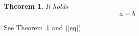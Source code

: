 \documentclass{article}
\newtheorem{theorem}{Theorem}
\begin{document}
\begin{theorem}
It holds
\begin{equation}
a=b \label{eq}
\end{equation}
\label{thm}
\end{theorem}
See Theorem~\ref{thm} and (\ref{eq}).
\end{document}
